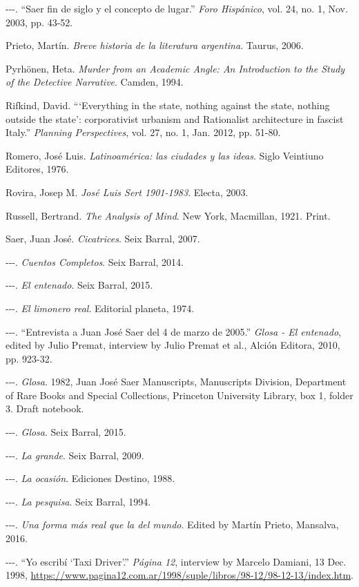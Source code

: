 \documentclass[11pt]{report}
\begin{document}
\begin{hangparas}{.25in}{1}
-{}-{}-. ``Saer fin de siglo y el concepto de lugar.'' \textit{Foro Hispánico}, vol. 24, no. 1, Nov. 2003, pp. 43-52.

Prieto, Martín. \textit{Breve historia de la literatura argentina}. Taurus, 2006.

Pyrhönen, Heta. \textit{Murder from an Academic Angle: An Introduction to the Study of the Detective Narrative}. Camden, 1994.

Rifkind, David. ```Everything in the state, nothing against the state, nothing outside the state': corporativist urbanism and Rationalist architecture in fascist Italy.'' \textit{Planning Perspectives}, vol. 27, no. 1, Jan. 2012, pp. 51-80.

Romero, José Luis. \textit{Latinoamérica: las ciudades y las ideas}. Siglo Veintiuno Editores, 1976.

Rovira, Josep M. \textit{José Luis Sert 1901-1983}. Electa, 2003.

Russell, Bertrand. \textit{The Analysis of Mind}. New York, Macmillan, 1921. Print.

Saer, Juan José. \textit{Cicatrices}. Seix Barral, 2007.

-{}-{}-. \textit{Cuentos Completos}. Seix Barral, 2014.

-{}-{}-. \textit{El entenado}. Seix Barral, 2015.

-{}-{}-. \textit{El limonero real}. Editorial planeta, 1974.

-{}-{}-. ``Entrevista a Juan José Saer del 4 de marzo de 2005.'' \textit{Glosa - El entenado}, edited by Julio Premat, interview by Julio Premat et al., Alción Editora, 2010, pp. 923-32.

-{}-{}-. \textit{Glosa}. 1982, Juan José Saer Manuscripts, Manuscripts Division, Department of Rare Books and Special Collections, Princeton University Library, box 1, folder 3. Draft notebook.

-{}-{}-. \textit{Glosa}. Seix Barral, 2015.

-{}-{}-. \textit{La grande}. Seix Barral, 2009.

-{}-{}-. \textit{La ocasión}. Ediciones Destino, 1988.

-{}-{}-. \textit{La pesquisa}. Seix Barral, 1994.

-{}-{}-. \textit{Una forma más real que la del mundo}. Edited by Martín Prieto, Mansalva, 2016.

-{}-{}-. ``Yo escribí `Taxi Driver'.'' \textit{Página 12}, interview by Marcelo Damiani, 13 Dec. 1998, \url{https://www.pagina12.com.ar/1998/suple/libros/98-12/98-12-13/index.htm}.


\end{hangparas}
\end{document}
